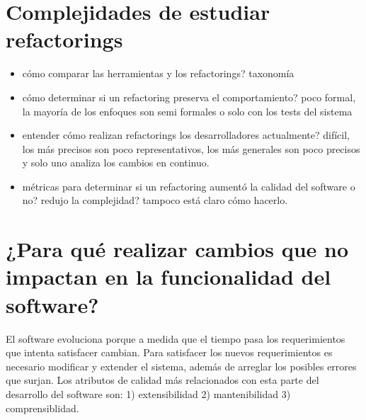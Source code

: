 \section{Complejidades de estudiar refactorings}

\begin{itemize}
    \item cómo comparar las herramientas y los refactorings? taxonomía
    \item cómo determinar si un refactoring preserva el comportamiento? poco formal, la mayoría de
    los enfoques son semi formales o solo con los tests del sistema
    \item entender cómo realizan refactorings los desarrolladores actualmente? difícil, los más
    precisos son poco representativos, los más generales son poco precisos y solo uno analiza los
    cambios en continuo.
    \item métricas para determinar si un refactoring aumentó la calidad del software o no? redujo la
    complejidad? tampoco está claro cómo hacerlo.
\end{itemize}

\section{¿Para qué realizar cambios que no impactan en la funcionalidad del software?}
El software evoluciona porque a
medida que el tiempo pasa los requerimientos que intenta satisfacer cambian. Para satisfacer los
nuevos requerimientos es necesario modificar y extender el sistema, además de arreglar los posibles
errores que surjan. Los atributos de calidad más relacionados con esta parte del desarrollo del
software son: 1) extensibilidad 2) mantenibilidad 3) comprensiblidad.

